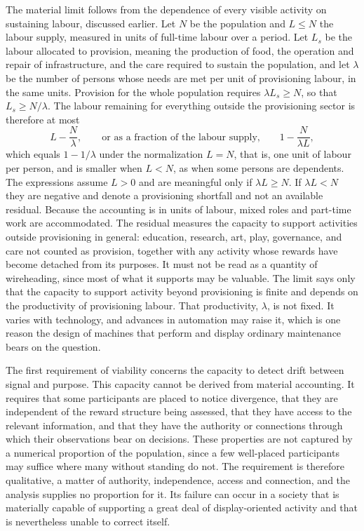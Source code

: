\documentclass[11pt]{article}
\theoremstyle{definition}
\theoremstyle{remark}
\begin{document}
The material limit follows from the dependence of every visible activity on sustaining labour, discussed earlier. Let $N$ be the population and $L \le N$ the labour supply, measured in units of full-time labour over a period. Let $L_s$ be the labour allocated to provision, meaning the production of food, the operation and repair of infrastructure, and the care required to sustain the population, and let $\lambda$ be the number of persons whose needs are met per unit of provisioning labour, in the same units. Provision for the whole population requires $\lambda L_s \ge N$, so that $L_s \ge N/\lambda$. The labour remaining for everything outside the provisioning sector is therefore at most
\[
L - \frac{N}{\lambda}, \qquad\text{or as a fraction of the labour supply,}\qquad 1 - \frac{N}{\lambda L},
\]
which equals $1 - 1/\lambda$ under the normalization $L = N$, that is, one unit of labour per person, and is smaller when $L < N$, as when some persons are dependents. The expressions assume $L > 0$ and are meaningful only if $\lambda L \ge N$. If $\lambda L < N$ they are negative and denote a provisioning shortfall and not an available residual. Because the accounting is in units of labour, mixed roles and part-time work are accommodated. The residual measures the capacity to support activities outside provisioning in general: education, research, art, play, governance, and care not counted as provision, together with any activity whose rewards have become detached from its purposes. It must not be read as a quantity of wireheading, since most of what it supports may be valuable. The limit says only that the capacity to support activity beyond provisioning is finite and depends on the productivity of provisioning labour. That productivity, $\lambda$, is not fixed. It varies with technology, and advances in automation may raise it, which is one reason the design of machines that perform and display ordinary maintenance bears on the question.

The first requirement of viability concerns the capacity to detect drift between signal and purpose. This capacity cannot be derived from material accounting. It requires that some participants are placed to notice divergence, that they are independent of the reward structure being assessed, that they have access to the relevant information, and that they have the authority or connections through which their observations bear on decisions. These properties are not captured by a numerical proportion of the population, since a few well-placed participants may suffice where many without standing do not. The requirement is therefore qualitative, a matter of authority, independence, access and connection, and the analysis supplies no proportion for it. Its failure can occur in a society that is materially capable of supporting a great deal of display-oriented activity and that is nevertheless unable to correct itself.
\end{document}
